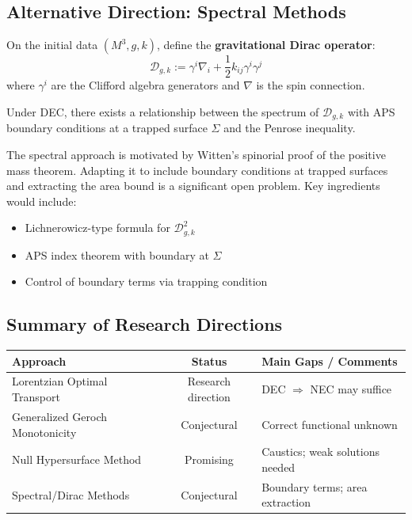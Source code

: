 \subsection{Alternative Direction: Spectral Methods}

\begin{definition}\label{def:GravDirac}
On the initial data $(M^3, g, k)$, define the \textbf{gravitational Dirac operator}:
\begin{equation}
    \mathcal{D}_{g,k} := \gamma^i \nabla_i + \frac{1}{2} k_{ij} \gamma^i \gamma^j
\end{equation}
where $\gamma^i$ are the Clifford algebra generators and $\nabla$ is the spin connection.
\end{definition}

\begin{conjecture}\label{conj:SpectralMassArea}
Under DEC, there exists a relationship between the spectrum of $\mathcal{D}_{g,k}$ with APS boundary conditions at a trapped surface $\Sigma$ and the Penrose inequality.
\end{conjecture}

\begin{remark}
The spectral approach is motivated by Witten's spinorial proof of the positive mass theorem. Adapting it to include boundary conditions at trapped surfaces and extracting the area bound is a significant open problem. Key ingredients would include:
\begin{itemize}
    \item Lichnerowicz-type formula for $\mathcal{D}_{g,k}^2$
    \item APS index theorem with boundary at $\Sigma$
    \item Control of boundary terms via trapping condition
\end{itemize}
\end{remark}

\subsection{Summary of Research Directions}

\begin{center}
\begin{tabular}{|l|c|l|}
\hline
\textbf{Approach} & \textbf{Status} & \textbf{Main Gaps / Comments} \\
\hline
Lorentzian Optimal Transport & Research direction & DEC $\Rightarrow$ NEC may suffice \\
Generalized Geroch Monotonicity & Conjectural & Correct functional unknown \\
Null Hypersurface Method & Promising & Caustics; weak solutions needed \\
Spectral/Dirac Methods & Conjectural & Boundary terms; area extraction \\
\hline
\end{tabular}
\end{center}

